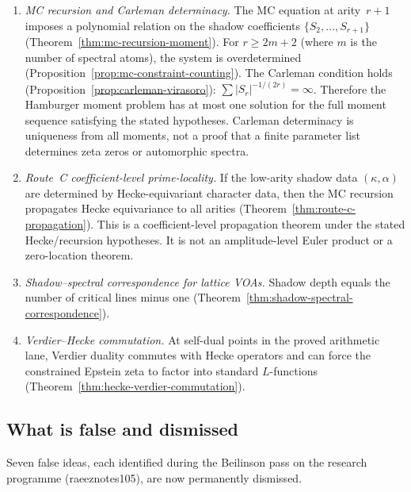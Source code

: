 \documentclass[11pt]{article}
\begin{document}
\begin{enumerate}
\item \emph{MC recursion and Carleman determinacy.}
The MC equation at arity~$r+1$ imposes a polynomial relation on
the shadow coefficients $\{S_2, \ldots, S_{r+1}\}$
(Theorem~\ref{thm:mc-recursion-moment}).
For $r \ge 2m+2$ (where $m$ is the number of spectral atoms),
the system is overdetermined
(Proposition~\ref{prop:mc-constraint-counting}).
The Carleman condition holds
(Proposition~\ref{prop:carleman-virasoro}):
$\sum |S_r|^{-1/(2r)} = \infty$.
Therefore the Hamburger moment problem has at most one solution
for the full moment sequence satisfying the stated hypotheses.
Carleman determinacy is uniqueness from all moments, not a proof
that a finite parameter list determines zeta zeros or automorphic
spectra.

\item \emph{Route~C coefficient-level prime-locality.}
If the low-arity shadow data $(\kappa, \alpha)$ are determined
by Hecke-equivariant character data, then the MC recursion
propagates Hecke equivariance to all arities
(Theorem~\ref{thm:route-c-propagation}).
This is a coefficient-level propagation theorem under the stated
Hecke/recursion hypotheses.  It is not an amplitude-level Euler
product or a zero-location theorem.

\item \emph{Shadow--spectral correspondence for lattice VOAs.}
Shadow depth equals the number of critical lines minus one
(Theorem~\ref{thm:shadow-spectral-correspondence}).

\item \emph{Verdier--Hecke commutation.}
At self-dual points in the proved arithmetic lane, Verdier duality
commutes with Hecke operators and can force the constrained
Epstein zeta to factor into standard $L$-functions
(Theorem~\ref{thm:hecke-verdier-commutation}).
\end{enumerate}

\subsection{What is false and dismissed}

Seven false ideas, each identified during the Beilinson pass on
the research programme (raeeznotes105), are now permanently
dismissed.
\end{document}

